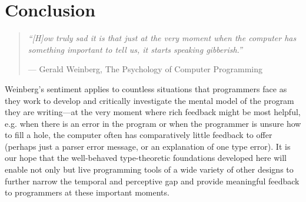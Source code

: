 \newcommand{\discussionSection}{Conclusion}
\section{\discussionSection} %
\label{sec:discussion}

\begin{comment}
To conclude, we quote Weinberg from The Psychology of Computer Programming (1998): ``how truly sad it is that just at the very moment
when the computer has something important to tell us, it starts
speaking gibberish.''
\end{comment}
\vspace{3pt}
\begin{quote}
\textit{``[H]ow truly sad it is that just at the very moment
when the computer has something important to tell us, it starts
speaking gibberish.''}

\vspace{3pt}

\hfill{}--- Gerald Weinberg, The Psychology of Computer Programming \cite{weinberg1971psychology}
\end{quote}
\vspace{3pt}

\noindent
%
Weinberg's sentiment applies to countless situations that programmers face as they work to develop and critically investigate the mental model of the program they are writing---at the very moment where rich feedback might be most helpful, e.g. when there is an error in the program or when the programmer is unsure how to fill a hole, the computer often has comparatively little feedback to offer (perhaps just a parser error message, or an explanation of one type error). 
%
%
%
It is our hope that the well-behaved  type-theoretic foundations developed here will enable not only \Hazel but live programming tools of a wide variety of other designs to further narrow the temporal and perceptive gap and provide meaningful feedback to programmers at these important   moments. 


